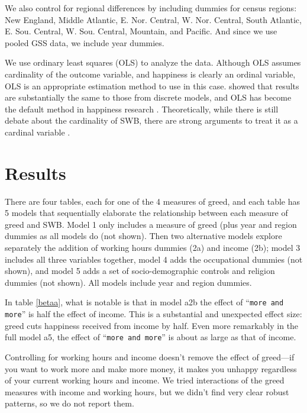 \documentclass[10pt, letterpaper]{article}
\begin{document}
\begin{spacing}{1.8}
We also control for regional  differences by including dummies for census regions:  New England, Middle Atlantic, E. Nor. Central, W. Nor. Central, South
Atlantic, E. Sou. Central, W. Sou. Central, Mountain, and Pacific. And since we use pooled GSS data, we include year dummies.

We use ordinary least squares (OLS) to analyze the data. Although OLS assumes cardinality of the outcome variable, and happiness is clearly an ordinal variable, 
OLS is an appropriate estimation method to use in this case. \citet{carbonell04} showed that results are substantially the same to those from discrete models, 
and OLS has become the default method in happiness research \citep{blanchflower11}.
Theoretically, while there is still debate about the cardinality of SWB, there are strong arguments to treat it as a cardinal variable \citep{ng96,ng97,ng11}. 


\section{Results}

There are four tables, each for one of the 4  measures of
greed, and each table has 5 models that sequentially elaborate the relationship between each measure of greed and SWB. Model 1 only includes a measure of greed (plus year and region dummies as all models do (not shown). Then  two
alternative models  explore separately the addition of working hours dummies (2a)
and income (2b); model 3 includes all three variables together, model 4 adds the occupational dummies (not shown), and model 5 adds a set of socio-demographic
controls and religion dummies (not shown). All models include year and region dummies.

In table \ref{betaa}, what is notable is that in model a2b the effect of ``\texttt{more and more}'' is half the effect of income. This is a substantial and unexpected effect size: greed cuts happiness received from income by half. Even more remarkably in the full model a5, the effect of ``\texttt{more and more}'' is about as large as that of income.

Controlling for working hours and income doesn't remove the effect of greed---if you want to work more and make more money, it makes you unhappy regardless of your current working hours and
income. {We tried interactions of the greed measures with income and working hours, but we didn't find very clear robust patterns, so we do not report them.}



\end{spacing}
\end{document}

